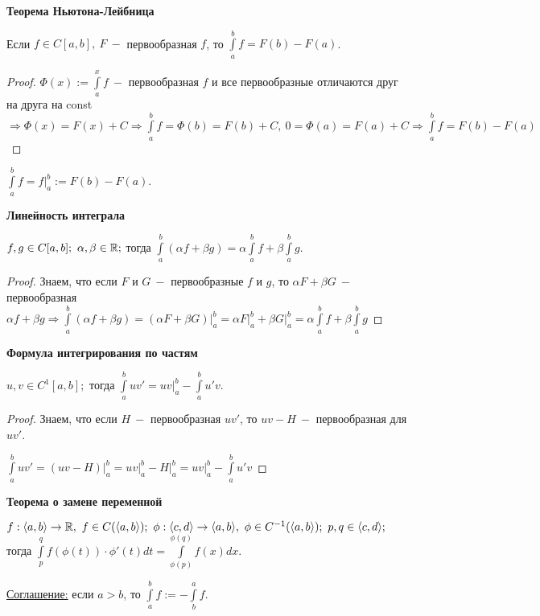 \begin{theorem}
    \textbf{Теорема Ньютона-Лейбница}

    Если $f\in C[a,b],\ F\ -$ первообразная $f$, то $\int\limits_a^b f =F(b)-F(a)$.
\end{theorem}

\begin{proof}
    $\Phi(x):= \int\limits_a^x f\ -$ первообразная $f$ и все первообразные отличаются друг на друга на const $\Rightarrow \Phi(x)=F(x)+C\Rightarrow \int\limits_a^b f =\Phi(b) = F(b)+C,\ 0=\Phi(a)=F(a)+C\Rightarrow \int\limits_a^b f = F(b)-F(a)$
\end{proof}

\begin{designation}
    $\int\limits_a^b f=\left. f\right|_a^b := F(b)-F(a)$.
\end{designation}

\begin{theorem}
    \textbf{Линейность интеграла}

    $f,g\in C[a,b];\ \alpha,\beta\in \mathbb{R};$ тогда $\int\limits_a^b (\alpha f + \beta g)= \alpha \int\limits_a^b f + \beta \int\limits_a^b g$.
\end{theorem}

\begin{proof}
    Знаем, что если $F$ и $G\ -$ первообразные $f$ и $g$, то $\alpha F + \beta G\ -$ первообразная $\alpha f + \beta g\Rightarrow \int\limits_a^b (\alpha f + \beta g)=\left.(\alpha F + \beta G)\right|_a^b=\left.\alpha F\right|_a^b+\left.\beta G\right|_a^b=\alpha \int\limits_a^b f + \beta \int\limits_a^b g$
\end{proof}

\begin{theorem}
    \textbf{Формула интегрирования по частям}

    $u,v\in C^1[a,b];$ тогда $\int\limits_a^b uv'=\left.uv\right|_a^b-\int\limits_a^b u'v$.
\end{theorem}

\begin{proof}
    Знаем, что если $H\ -$ первообразная $uv'$, то $uv-H\ -$ первообразная для $uv'$.

    $\int\limits_a^b uv'=\left.(uv-H)\right|_a^b=\left.uv\right|_a^b - \left.H\right|_a^b=\left.uv\right|_a^b-\int\limits_a^b u'v$
\end{proof}

\begin{theorem}
    \textbf{Теорема о замене переменной}

    $f:\langle a,b \rangle \rightarrow \R,\ f\in C(\langle a, b\rangle);\ \phi: \langle c, d\rangle\rightarrow \langle a, b\rangle,\ \phi\in C^{-1}(\langle a, b\rangle);\ p,q\in \langle c, d\rangle;$ тогда $\int\limits_p^q f(\phi(t))\cdot \phi '(t)dt=\int\limits_{\phi(p)}^{\phi(q)}f(x)dx$.

    \underline{Соглашение:} если $a>b$, то $\int\limits_a^b f:=-\int\limits_b^a f$.
\end{theorem}

